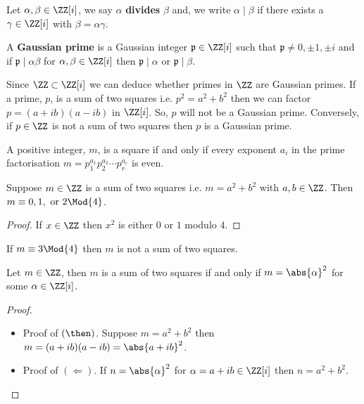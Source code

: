 \documentclass[12pt, a4paper]{article}
\begin{document}
\begin{theorem}
    Let \(\alpha, \beta \in \ZZ[i]\), we say \(\alpha\) \textbf{divides} \(\beta\) and, we write \(\alpha \mid \beta\) if there exists a \(\gamma \in \ZZ[i]\) with \(\beta =\alpha\gamma\).
\end{theorem}

\begin{definition}
    A \textbf{Gaussian prime} is a Gaussian integer \(\mathfrak{p} \in \ZZ[i]\) such that \(\mathfrak{p} \neq 0,\pm 1, \pm i\) and if \(\mathfrak{p} \mid \alpha \beta\) for \(\alpha, \beta \in \ZZ[i]\) then \(\mathfrak{p} \mid \alpha\) or \(\mathfrak{p} \mid \beta\).
\end{definition}

\begin{mdremark}
    Since \(\ZZ \subset \ZZ[i]\) we can deduce whether primes in \(\ZZ\) are Gaussian primes. If a prime, \(p\), is a sum of two squares i.e. \(p^2 =a^2+b^2\) then we can factor \(p=(a+ib)(a-ib)\) in \(\ZZ[i]\). So, \(p\) will not be a Gaussian prime. Conversely, if \(p \in \ZZ\) is not a sum of two squares then \(p\) is a Gaussian prime.
\end{mdremark}

\begin{proposition}
    A positive integer, \(m\), is a square if and only if every exponent \(a_i\) in the prime factorisation \(m=p_1^{a_1}p_2^{a_2} \cdots p_r^{a_r}\) is even.
\end{proposition}

\begin{mdlemma}
    Suppose \(m\in \ZZ\) is a sum of two squares i.e. \(m=a^2+b^2\) with \(a,b\in \ZZ\). Then \(m \equiv 0,1, \text{ or } 2 \Mod{4}\).
\end{mdlemma}

\begin{proof}
    If \(x\in \ZZ\) then \(x^2\) is either \(0\) or \(1\) modulo \(4\).
\end{proof}

\begin{mdcor}
    If \(m \equiv 3 \Mod{4}\) then \(m\) is not a sum of two squares.
\end{mdcor}

\begin{lemma}
    Let \(m \in \ZZ\), then \(m\) is a sum of two squares if and only if \(m=\abs{\alpha}^2\) for some \(\alpha\in \ZZ[i]\).
\end{lemma}

\begin{proof}
    \hphantom{Space}
    \begin{itemize}
        \item Proof of \((\then)\).
        Suppose \(m = a^2+b^2\) then \(m=(a+ib)(a-ib) = \abs{a+ib}^2\).
        \item Proof of \((\Leftarrow)\).
        If \(n=\abs{\alpha}^2\) for \(\alpha =a+ib \in \ZZ[i]\) then \(n=a^2+b^2\).
    \end{itemize}
\end{proof}
\end{document}
